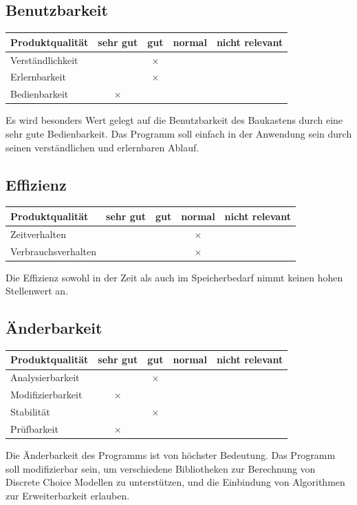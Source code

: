 \documentclass{article}
\begin{document}
\subsection{Benutzbarkeit}
\begin{table}[H]
\centering
\begin{tabular}{lcccc}
\hline
\textbf{Produktqualität} & sehr gut & gut      & normal & nicht relevant \\ \hline
Verständlichkeit         &          & $\times$ &        &                \\
Erlernbarkeit            &          & $\times$ &        &                \\
Bedienbarkeit            & $\times$ &          &        &                \\
\end{tabular}
\end{table}
Es wird besonders Wert gelegt auf die Benutzbarkeit des Baukastens durch eine sehr gute Bedienbarkeit. Das Programm soll einfach in der Anwendung sein durch seinen verständlichen und erlernbaren Ablauf.

\subsection{Effizienz}
\begin{table}[H]
\centering
\begin{tabular}{lcccc}
\hline
\textbf{Produktqualität} & sehr gut & gut & normal   & nicht relevant \\ \hline
Zeitverhalten            &          &     & $\times$ &                \\
Verbrauchsverhalten      &          &     & $\times$ &               
\end{tabular}
\end{table}
Die Effizienz sowohl in der Zeit als auch im Speicherbedarf nimmt keinen hohen Stellenwert an. 

\subsection{Änderbarkeit}
\begin{table}[H]
\centering
\begin{tabular}{lcccc}
\hline
\textbf{Produktqualität} & sehr gut & gut      & normal & nicht relevant \\ \hline
Analysierbarkeit         &          & $\times$ &        &                \\
Modifizierbarkeit        & $\times$ &          &        &                \\
Stabilität               &          & $\times$ &        &                \\
Prüfbarkeit              & $\times$ &          &        &                \\
\end{tabular}
\end{table}
Die Änderbarkeit des Programms ist von höchster Bedeutung. Das Programm soll modifizierbar sein, um verschiedene Bibliotheken zur Berechnung von Discrete Choice Modellen zu unterstützen, und die Einbindung von Algorithmen zur Erweiterbarkeit erlauben.

\newpage
\printglossaries
\end{document}
